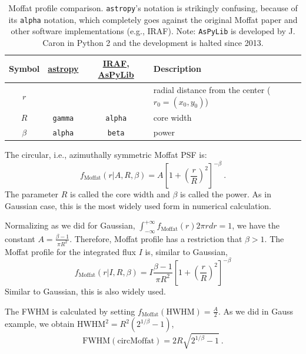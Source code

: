 \begin{table}
\label{tab: Moffat}
\caption{Moffat profile comparison. \texttt{astropy}'s notation is strikingly confusing, because of its \texttt{alpha} notation, which completely goes against the original Moffat paper and other software implementations (e.g., IRAF). Note: \texttt{AsPyLib} is developed by J. Caron in Python 2 and the development is halted since 2013.}
\centering
\begin{tabular}{cccl}
  \hline
  Symbol &
  \href{http://docs.astropy.org/en/stable/api/astropy.modeling.functional_models.Moffat2D.html\#astropy.modeling.functional_models.Moffat2D}{astropy} & 
  \href{https://iraf.net/irafhelp.php?val=psfmeasure&help=Help+Page}{IRAF}, \href{http://www.aspylib.com/doc/aspylib_fitting.html}{AsPyLib} & 
  Description \\
  \hline
  $ r $ & & & radial distance from the center ($ r_0 = (x_0, y_0) $) \\
  $ R $ & \texttt{gamma} & \texttt{alpha} & core width \\
  $ \beta $& \texttt{alpha} & \texttt{beta} & power \\
  \hline
\end{tabular}
\end{table}

The circular, i.e., azimuthally symmetric Moffat PSF is:
\begin{equation}\label{eq: profile moffat}
  f_\mathrm{Moffat} (r|A, R, \beta) = A \left [ 1 + \left ( \frac{r}{R} \right )^2 \right ]^{-\beta} ~.
\end{equation}
The parameter $R$ is called the core width and $\beta$ is called the power. As in Gaussian case, this is the most widely used form in numerical calculation.

Normalizing as we did for Gaussian, $ \int_{-\infty}^{+\infty} f_\mathrm{Moffat}(r) 2\pi r dr = 1 $, we have the constant $ A = \frac{\beta - 1}{\pi R^2} $. Therefore, Moffat profile has a restriction that $ \beta > 1 $. The Moffat profile for the integrated flux $ I $ is, similar to Gaussian,
\begin{equation}\label{eq: profile moffat flux}
  f_\mathrm{Moffat}(r|I, R, \beta) = I \frac{\beta - 1}{\pi R^2} \left [ 1 + \left ( \frac{r}{R} \right )^2 \right ]^{-\beta}
\end{equation} 
Similar to Gaussian, this is also widely used.

The FWHM is calculated by setting $f_\mathrm{Moffat}(\mathrm{HWHM}) = \frac{A}{2}$. As we did in Gauss example, we obtain $ \mathrm{HWHM}^2 = R^2 (2^{1/\beta}-1) $,
\begin{equation}\label{eq: FWHM moffat}
  \mathrm{FWHM}(\mathrm{circMoffat}) = 2 R \sqrt{2^{1/\beta}-1} ~.
\end{equation}


